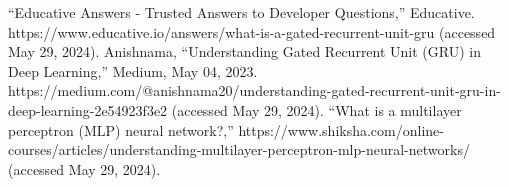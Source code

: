\documentclass{ieeeojies}
\begin{document}
\begin{thebibliography}{00}
		
		 “Educative Answers - Trusted Answers to Developer Questions,” Educative. https://www.educative.io/answers/what-is-a-gated-recurrent-unit-gru (accessed May 29, 2024).
		 Anishnama, “Understanding Gated Recurrent Unit (GRU) in Deep Learning,” Medium, May 04, 2023. https://medium.com/@anishnama20/understanding-gated-recurrent-unit-gru-in-deep-learning-2e54923f3e2 (accessed May 29, 2024).
		 “What is a multilayer perceptron (MLP) neural network?,” https://www.shiksha.com/online-courses/articles/understanding-multilayer-perceptron-mlp-neural-networks/ (accessed May 29, 2024).
		‌
		
		
		
	\end{thebibliography}
	
	\EOD
	
\end{document}
